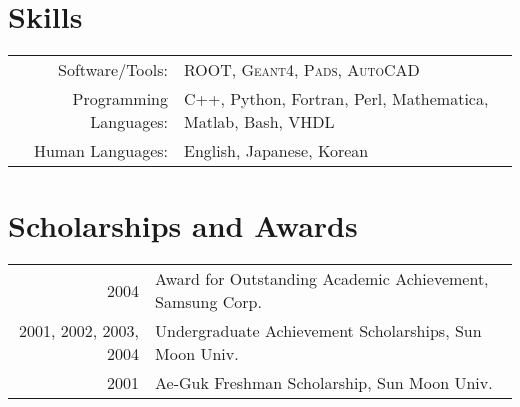 \documentclass[a4paper,10pt]{article} %
\begin{document}

\section{Skills}

\begin{tabular}{rl}
	Software/Tools: & \textsc{ROOT}, \textsc{Geant4}, \textsc{Pads},
	\textsc{AutoCAD}\\
	Programming Languages: & C++, Python, Fortran, Perl, Mathematica, Matlab, Bash, VHDL\\
	Human Languages: & English, Japanese, Korean
\end{tabular}


\section{Scholarships and Awards}

\begin{tabular}{rl}
	2004 & Award for Outstanding Academic Achievement, Samsung Corp.\\
	2001, 2002, 2003, 2004 & Undergraduate Achievement Scholarships, Sun Moon
	Univ.\\
	2001 & Ae-Guk Freshman Scholarship, Sun Moon Univ.\\
\end{tabular}


%
%

\end{document}
